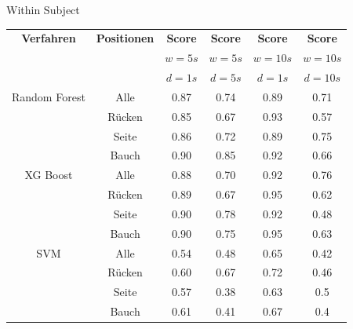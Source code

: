 \documentclass[18pt]{beamer}
\begin{document}
\begin{frame}{Within Subject}
    \begin{tabular}{|c|c|c|c|c|c|}
        \hline
        \textbf{Verfahren} & \textbf{Positionen} & \textbf{Score} & \textbf{Score} & \textbf{Score} & \textbf{Score} \\ 
        & & $w=5s$ & $w=5s$ & $w=10s$ & $w=10s$ \\
        & & $d=1s$ & $d=5s$ & $d=1s$ & $d=10s$ \\
        \hline
        Random Forest & Alle &  0.87 & 0.74 & 0.89 & 0.71 \\ 
        & Rücken & 0.85 & 0.67 & 0.93 & 0.57 \\
        & Seite  & 0.86 & 0.72 & 0.89 & 0.75 \\
        & Bauch  & 0.90 & 0.85 & 0.92 & 0.66 \\ \hline
        XG Boost  & Alle & 0.88 & 0.70 & 0.92 & 0.76 \\ 
        & Rücken & 0.89 & 0.67 & 0.95 & 0.62 \\
        & Seite  & 0.90 & 0.78 & 0.92 & 0.48 \\
        & Bauch  & 0.90 & 0.75 & 0.95 & 0.63 \\ \hline
        SVM & Alle& 0.54 & 0.48 & 0.65 & 0.42 \\ 
        & Rücken & 0.60 & 0.67 & 0.72 & 0.46 \\
        & Seite  & 0.57 & 0.38 & 0.63 & 0.5 \\
        & Bauch  & 0.61 & 0.41 & 0.67 & 0.4 \\
        \hline
    \end{tabular}
\end{frame}
\end{document}
